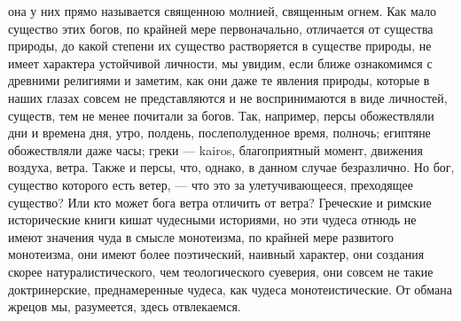 \documentclass[12pt]{article}
\begin{document}
она у них прямо называется священною молнией, священным огнем. Как мало существо этих богов, по крайней мере первоначально, отличается от существа природы, до какой степени их существо растворяется в существе природы, не имеет характера устойчивой личности, мы увидим, если ближе ознакомимся с древними религиями и заметим, как они даже те явления природы, которые в наших глазах совсем не представляются и не воспринимаются в виде личностей, существ, тем не менее почитали за богов. Так, например, персы обожествляли дни и времена дня, утро, полдень, послеполуденное время, полночь; египтяне обожествляли даже часы; греки --- kairos, благоприятный момент, движения воздуха, ветра. Также и персы, что, однако, в данном случае безразлично. Но бог, существо которого есть ветер, --- что это за улетучивающееся, преходящее существо? Или кто может бога ветра отличить от ветра? Греческие и римские исторические книги кишат чудесными историями, но эти чудеса отнюдь не имеют значения чуда в смысле монотеизма, по крайней мере развитого монотеизма, они имеют более поэтический, наивный характер, они создания скорее натуралистического, чем теологического суеверия, они совсем не такие доктринерские, преднамеренные чудеса, как чудеса монотеистические. От обмана жрецов мы, разумеется, здесь отвлекаемся. 
\end{document}
